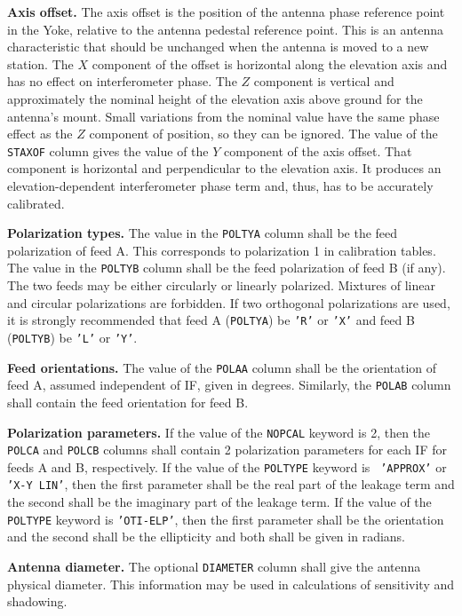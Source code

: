 \documentclass[twoside]{article}
\begin{document}
{\bf Axis offset.} The axis offset is the position of the antenna
phase reference point in the Yoke, relative to the antenna pedestal
reference point. This is an antenna characteristic that should be
unchanged when the antenna is moved to a new station.  The $X$
component of the offset is horizontal along the elevation axis and has
no effect on interferometer phase.  The $Z$ component is vertical and
approximately the nominal height of the elevation axis above ground
for the antenna's mount.  Small variations from the nominal value have
the same phase effect as the $Z$ component of position, so they can be
ignored.  The value of the {\tt STAXOF} column gives the value of the
$Y$ component of the axis offset.  That component is horizontal and
perpendicular to the elevation axis.  It produces an
elevation-dependent interferometer phase term and, thus, has to be
accurately calibrated.

{\bf Polarization types.}  The value in the {\tt POLTYA} column shall
be the feed polarization of feed A\@.  This corresponds to
polarization 1 in calibration tables.  The value in the {\tt POLTYB}
column shall be the feed polarization of feed B (if any).  The two
feeds may be either circularly or linearly polarized.  Mixtures of
linear and circular polarizations are forbidden.  If two orthogonal
polarizations are used, it is strongly recommended that feed A
({\tt POLTYA}) be {\tt 'R'} or {\tt 'X'} and feed B ({\tt POLTYB}) be
{\tt 'L'} or {\tt 'Y'}\@.

{\bf Feed orientations.} The value of the {\tt POLAA} column shall be
the orientation of feed A, assumed independent of IF, given in
degrees.  Similarly, the {\tt POLAB} column shall contain the feed
orientation for feed B\@.

{\bf Polarization parameters.}  If the value of the {\tt NOPCAL}
keyword is 2, then the {\tt POLCA} and {\tt POLCB} columns shall
contain 2 polarization parameters for each IF for feeds A and B,
respectively.  If the value of the {\tt POLTYPE} keyword is {\tt
  'APPROX'} or {\tt 'X-Y LIN'}, then the first parameter shall be the
real part of the leakage term and the second shall be the imaginary
part of the leakage term.  If the value of the {\tt POLTYPE} keyword
is {\tt 'OTI-ELP'}, then the first parameter shall be the orientation
and the second shall be the ellipticity and both shall be given in
radians.

{\bf Antenna diameter.} The optional {\tt DIAMETER} column shall give
the antenna physical diameter.  This information may be used in
calculations of sensitivity and shadowing.
\end{document}
